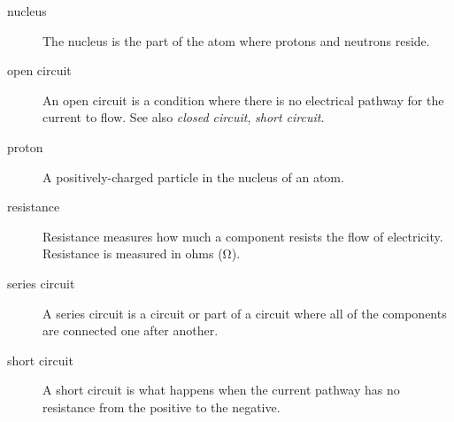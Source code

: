 \begin{description}
\item[nucleus] The nucleus is the part of the atom where protons and neutrons reside. 
\item[open circuit] An open circuit is a condition where there is no electrical pathway for the current to flow.  See also \emph{closed circuit}, \emph{short circuit}.
\item[proton] A positively-charged particle in the nucleus of an atom.
\item[resistance] Resistance measures how much a component resists the flow of electricity.  Resistance is measured in ohms (\si{\ohm}).
\item[series circuit] A series circuit is a circuit or part of a circuit where all of the components are connected one after another.
\item[short circuit] A short circuit is what happens when the current pathway has no resistance from the positive to the negative.
\end{description}
